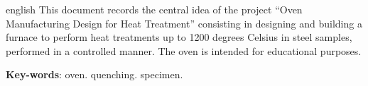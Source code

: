 \begin{resumo}[Abstract]
 \begin{otherlanguage*}{english}
   This document records the central idea of the project “Oven Manufacturing Design for Heat Treatment” consisting in designing and building a furnace to perform heat treatments up to 1200 degrees Celsius in steel samples, performed in a controlled manner. The oven is intended for educational purposes.

   \vspace{\onelineskip}
 
   \noindent 
   \textbf{Key-words}: oven. quenching. specimen.
 \end{otherlanguage*}
\end{resumo}
